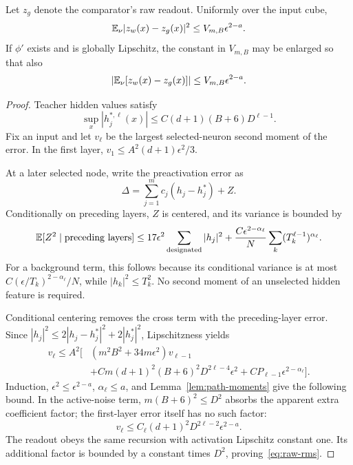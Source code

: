 \begin{lemma}\label{lem:raw-perturbation}
Let $z_g$ denote the comparator's raw readout. Uniformly over the input cube,
\begin{equation}
 \mathbb E_\nu|z_w(x)-z_g(x)|^2
 \le V_{m,B}\epsilon^{2-a}.
 \label{eq:raw-rms}
\end{equation}
If $\phi'$ exists and is globally Lipschitz, the constant in $V_{m,B}$ may be enlarged so that also
\begin{equation}
 \left|\mathbb E_\nu[z_w(x)-z_g(x)]\right|
 \le V_{m,B}\epsilon^{2-a}.
 \label{eq:raw-bias}
\end{equation}
\end{lemma}
\begin{proof}
Teacher hidden values satisfy
\[
 \sup_x|h_j^{*,\ell}(x)|
 \le C(d+1)(B+6)D^{\ell-1}.
\]
Fix an input and let $v_\ell$ be the largest selected-neuron second moment of the error. In the first layer,
$v_1\le A^2(d+1)\epsilon^2/3$.

At a later selected node, write the preactivation error as
\[
 \Delta=\sum_{j=1}^m c_j(h_j-h_j^*)+Z.
\]
Conditionally on preceding layers, $Z$ is centered, and its variance is bounded by
\begin{equation}
 \mathbb E[Z^2\mid\text{preceding layers}]
 \le17\epsilon^2\sum_{\mathrm{designated}}|h_j|^2
 +\frac{C\epsilon^{2-\alpha_\ell}}N
       \sum_k(T_k^{\ell-1})^{\alpha_\ell}.
 \label{eq:adaptive-variance}
\end{equation}
For a background term, this follows because its conditional variance is at most
$C(\epsilon/T_k)^{2-\alpha_\ell}/N$, while $|h_k|^2\le T_k^2$.
No second moment of an unselected hidden feature is required.

Conditional centering removes the cross term with the preceding-layer error. Since
$|h_j|^2\le2|h_j-h_j^*|^2+2|h_j^*|^2$, Lipschitzness yields
\begin{align}
 v_\ell\le A^2\bigg[&(m^2B^2+34m\epsilon^2)v_{\ell-1}\\
 &+Cm(d+1)^2(B+6)^2D^{2\ell-4}\epsilon^2
 +C P_{\ell-1}\epsilon^{2-\alpha_\ell}\bigg].
 \label{eq:variance-recursion}
\end{align}
Induction, $\epsilon^2\le\epsilon^{2-a}$, $\alpha_\ell\le a$, and Lemma~\ref{lem:path-moments} give the following bound. In the active-noise term, $m(B+6)^2\le D^2$ absorbs the apparent extra coefficient factor; the first-layer error itself has no such factor:
\[
 v_\ell\le C_\ell(d+1)^2D^{2\ell-2}\epsilon^{2-a}.
\]
The readout obeys the same recursion with activation Lipschitz constant one. Its additional factor is bounded by a constant times $D^2$, proving~\eqref{eq:raw-rms}.


\end{proof}
